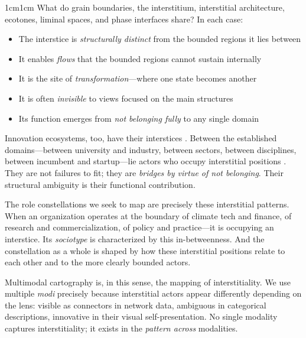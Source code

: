 \documentclass[../main.tex]{subfiles}
\begin{document}
\begin{adjustwidth}{1cm}{1cm}
What do grain boundaries, the interstitium, interstitial architecture, ecotones, liminal spaces, and phase interfaces share? In each case:

\begin{itemize}[leftmargin=2em, itemsep=0.3em]
    \item The interstice is \textit{structurally distinct} from the bounded regions it lies between
    \item It enables \textit{flows} that the bounded regions cannot sustain internally
    \item It is the site of \textit{transformation}---where one state becomes another
    \item It is often \textit{invisible} to views focused on the main structures
    \item Its function emerges from \textit{not belonging fully} to any single domain
\end{itemize}

Innovation ecosystems, too, have their interstices \cite{adner2017ecosystem,jacobides2018ecosystems}. Between the established domains---between university and industry, between sectors, between disciplines, between incumbent and startup---lie actors who occupy interstitial positions . They are not failures to fit; they are \textit{bridges by virtue of not belonging}. Their structural ambiguity is their functional contribution.

The role constellations we seek to map are precisely these interstitial patterns. When an organization operates at the boundary of climate tech and finance, of research and commercialization, of policy and practice---it is occupying an interstice. Its \textit{sociotype} is characterized by this in-betweenness. And the constellation as a whole is shaped by how these interstitial positions relate to each other and to the more clearly bounded actors.

Multimodal cartography is, in this sense, the mapping of interstitiality. We use multiple \textit{modi} precisely because interstitial actors appear differently depending on the lens: visible as connectors in network data, ambiguous in categorical descriptions, innovative in their visual self-presentation. No single modality captures interstitiality; it exists in the \textit{pattern across} modalities.


\end{adjustwidth}
\end{document}
